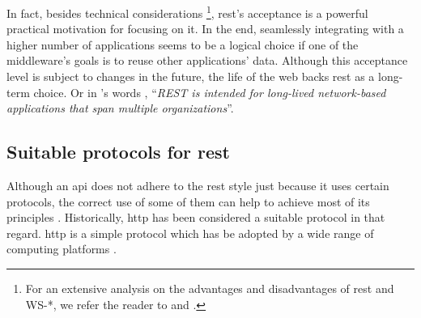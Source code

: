 In fact, besides technical considerations
\footnote{For an extensive analysis on the advantages and disadvantages of \ac{rest} and WS-*, we refer the reader to \citep{pautasso_restful_2008} and \citep{guinard_search_2011}.},
\ac{rest}'s acceptance is a powerful practical motivation for focusing on it.
In the end, seamlessly integrating with a higher number of applications seems to be a logical choice if one of the middleware's goals is to reuse other applications' data. %
Although this acceptance level is subject to changes in the future, the life of the web backs \ac{rest} as a long-term choice.
Or in \citeauthor{fielding_architectural_2000}'s words \cite[comment 21]{fielding_rest_2008},
``\emph{REST is intended for long-lived network-based applications that span multiple organizations}''.



\subsection{Suitable protocols for \acs{rest}}
\label{sec:protocols}

Although an \ac{api} does not adhere to the \ac{rest} style just because it uses certain protocols,
the correct use of some of them can help to achieve most of its principles \citep{moore_hypermedia_2010}.
Historically, \ac{http} has been considered a suitable protocol in that regard.
\ac{http} is a simple protocol which has be adopted by a wide range of computing platforms \citep{yazar_efficient_2009,hammel_mongoose:_2010}.


